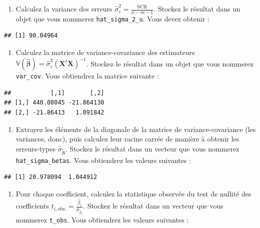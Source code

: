 \documentclass[
  11pt,
]{book}
\providecommand{\tightlist}{%
  \setlength{\itemsep}{0pt}\setlength{\parskip}{0pt}}
\numberwithin{equation}{section}
\numberwithin{countremarque}{section}
\newenvironment{greenbox}{
  \begin{tcolorbox}[breakable, colback=vert,coltext=black,
                  colframe=grisfonce]}
 {\end{tcolorbox}}
\begin{document}
\begin{greenbox}

\begin{enumerate}
\def\labelenumi{\arabic{enumi}.}
\setcounter{enumi}{17}
\tightlist
\item
  Calculez la variance des erreurs \(\hat{\sigma}^2_\varepsilon = \frac{\text{SCR}}{n-m-1}\). Stockez le résultat dans un objet que vous nommerez \texttt{hat\_sigma\_2\_u}. Vous devez obtenir :
\end{enumerate}

\begin{lstlisting}
## [1] 90.04964
\end{lstlisting}

\begin{enumerate}
\def\labelenumi{\arabic{enumi}.}
\setcounter{enumi}{18}
\tightlist
\item
  Calculez la matrice de variance-covariance des estimateurs \(\mathbb{V}\left(\hat{\boldsymbol\beta}\right) = \hat{\sigma}^2_\varepsilon \left(\boldsymbol X^t \boldsymbol X\right)^{-1}\). Stockez le résultat dans un objet que vous nommerez \texttt{var\_cov}. Vous obtiendrez la matrice suivante :
\end{enumerate}

\begin{lstlisting}
##           [,1]       [,2]
## [1,] 440.08045 -21.864130
## [2,] -21.86413   1.091842
\end{lstlisting}

\begin{enumerate}
\def\labelenumi{\arabic{enumi}.}
\setcounter{enumi}{19}
\tightlist
\item
  Extrayez les éléments de la diagonale de la matrice de variance-covariance (les variances, donc), puis calculez leur racine carrée de manière à obtenir les erreurs-types \(\hat{\sigma}_{\hat{\boldsymbol\beta}}\). Stockez le résultat dans un vecteur que vous nommerez \texttt{hat\_sigma\_betas}. Vous obtiendrez les valeurs suivantes :
\end{enumerate}

\begin{lstlisting}
## [1] 20.978094  1.044912
\end{lstlisting}

\begin{enumerate}
\def\labelenumi{\arabic{enumi}.}
\setcounter{enumi}{20}
\tightlist
\item
  Pour chaque coefficient, calculez la statistique observée du test de nullité des coefficients \(t_{i,\textrm{obs.}} = \frac{\hat{\beta}_i}{\hat{\sigma}_{\hat{\beta}_i}}\). Stockez le résultat dans un vecteur que vous nommerez \texttt{t\_obs}. Vous obtiendrez les valeurs suivantes :
\end{enumerate}


\end{greenbox}
\end{document}
